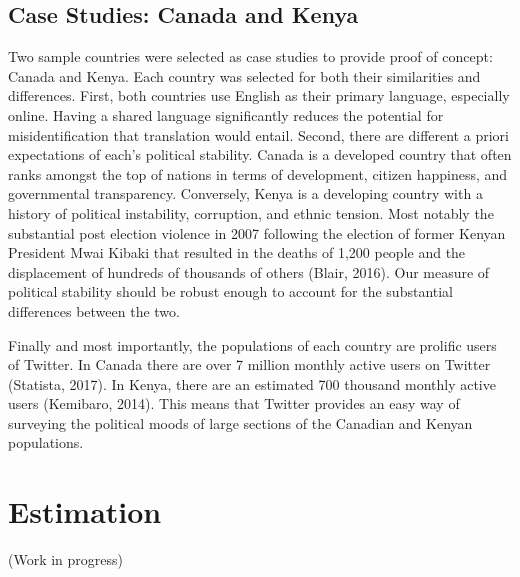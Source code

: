 \documentclass[12pt]{article}
\begin{document}
\begin{spacing}{1.5}
\subsection*{Case Studies: Canada and Kenya}

Two sample countries were selected as case studies to provide proof of concept: Canada and Kenya. Each country was selected for both their similarities and differences. First, both countries use English as their primary language, especially online. Having a shared language significantly reduces the potential for misidentification that translation would entail. Second, there are different a priori expectations of each’s political stability. Canada is a developed country that often ranks amongst the top of nations in terms of development, citizen happiness, and governmental transparency. Conversely, Kenya is a developing country with a history of political instability, corruption, and ethnic tension. Most notably the substantial post election violence in 2007 following the election of former Kenyan President Mwai Kibaki that resulted in the deaths of 1,200 people and the displacement of hundreds of thousands of others (Blair, 2016). Our measure of political stability should be robust enough to account for the substantial differences between the two.  

Finally and most importantly, the populations of each country are prolific users of Twitter. In Canada there are over 7 million monthly active users on Twitter (Statista, 2017). In Kenya, there are an estimated 700 thousand monthly active users (Kemibaro, 2014). This means that Twitter provides an easy way of surveying the political moods of large sections of the Canadian and Kenyan populations. 









  
\section*{Estimation}   

(Work in progress)


\end{spacing}
\end{document}
